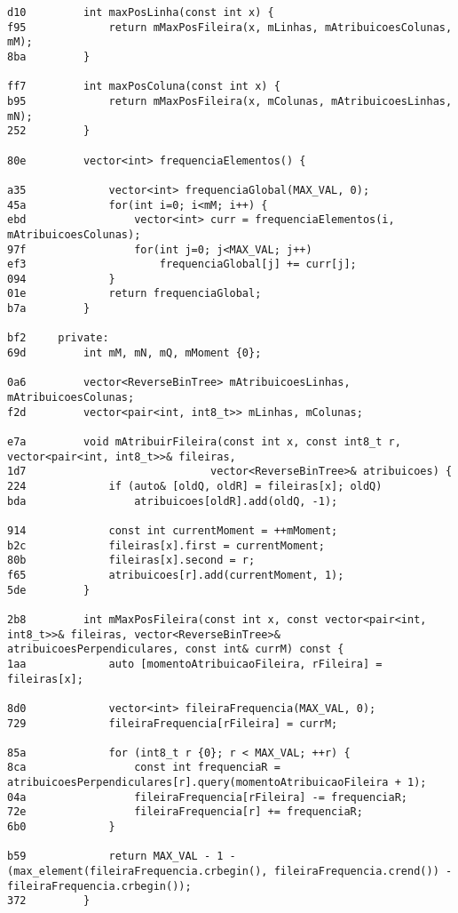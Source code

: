 \documentclass[11pt, a4paper, twoside]{article}
\begin{document}
\begin{lstlisting}
d10         int maxPosLinha(const int x) {
f95             return mMaxPosFileira(x, mLinhas, mAtribuicoesColunas, mM);
8ba         }
    
ff7         int maxPosColuna(const int x) {
b95             return mMaxPosFileira(x, mColunas, mAtribuicoesLinhas, mN);
252         }
    
80e         vector<int> frequenciaElementos() {
    
a35             vector<int> frequenciaGlobal(MAX_VAL, 0);
45a             for(int i=0; i<mM; i++) {
ebd                 vector<int> curr = frequenciaElementos(i, mAtribuicoesColunas);
97f                 for(int j=0; j<MAX_VAL; j++)
ef3                     frequenciaGlobal[j] += curr[j];
094             }
01e             return frequenciaGlobal;
b7a         }
    
bf2     private:
69d         int mM, mN, mQ, mMoment {0};
    
0a6         vector<ReverseBinTree> mAtribuicoesLinhas, mAtribuicoesColunas;
f2d         vector<pair<int, int8_t>> mLinhas, mColunas;
    
e7a         void mAtribuirFileira(const int x, const int8_t r, vector<pair<int, int8_t>>& fileiras,
1d7                             vector<ReverseBinTree>& atribuicoes) {
224             if (auto& [oldQ, oldR] = fileiras[x]; oldQ)
bda                 atribuicoes[oldR].add(oldQ, -1);
    
914             const int currentMoment = ++mMoment;
b2c             fileiras[x].first = currentMoment;
80b             fileiras[x].second = r;
f65             atribuicoes[r].add(currentMoment, 1);
5de         }
    
2b8         int mMaxPosFileira(const int x, const vector<pair<int, int8_t>>& fileiras, vector<ReverseBinTree>& atribuicoesPerpendiculares, const int& currM) const {
1aa             auto [momentoAtribuicaoFileira, rFileira] = fileiras[x];
    
8d0             vector<int> fileiraFrequencia(MAX_VAL, 0);
729             fileiraFrequencia[rFileira] = currM;
    
85a             for (int8_t r {0}; r < MAX_VAL; ++r) {
8ca                 const int frequenciaR = atribuicoesPerpendiculares[r].query(momentoAtribuicaoFileira + 1);
04a                 fileiraFrequencia[rFileira] -= frequenciaR;
72e                 fileiraFrequencia[r] += frequenciaR;
6b0             }
    
b59             return MAX_VAL - 1 - (max_element(fileiraFrequencia.crbegin(), fileiraFrequencia.crend()) - fileiraFrequencia.crbegin());
372         }
    

\end{lstlisting}
\end{document}
